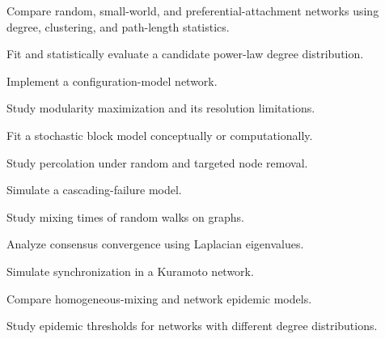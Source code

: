 \begin{exercise}[4]
Compare random, small-world, and preferential-attachment networks using
degree, clustering, and path-length statistics.
\end{exercise}

\begin{exercise}[4]
Fit and statistically evaluate a candidate power-law degree distribution.
\end{exercise}

\begin{exercise}[4]
Implement a configuration-model network.
\end{exercise}

\begin{exercise}[4]
Study modularity maximization and its resolution limitations.
\end{exercise}

\begin{exercise}[4]
Fit a stochastic block model conceptually or computationally.
\end{exercise}

\begin{exercise}[4]
Study percolation under random and targeted node removal.
\end{exercise}

\begin{exercise}[4]
Simulate a cascading-failure model.
\end{exercise}

\begin{exercise}[4]
Study mixing times of random walks on graphs.
\end{exercise}

\begin{exercise}[4]
Analyze consensus convergence using Laplacian eigenvalues.
\end{exercise}

\begin{exercise}[4]
Simulate synchronization in a Kuramoto network.
\end{exercise}

\begin{exercise}[4]
Compare homogeneous-mixing and network epidemic models.
\end{exercise}

\begin{exercise}[4]
Study epidemic thresholds for networks with different degree distributions.
\end{exercise}

